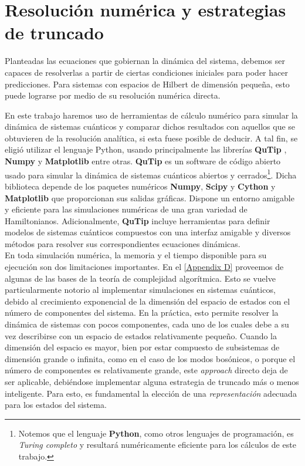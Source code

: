 \documentclass{report} %
\numberwithin{equation}{section}
\begin{document}
\section{Resoluci\'on num\'erica y estrategias de truncado}

Planteadas las ecuaciones que gobiernan la dinámica del sistema, debemos ser capaces de resolverlas a partir de ciertas condiciones iniciales para poder hacer predicciones. Para sistemas con espacios de Hilbert de dimensión pequeña, esto puede lograrse por medio de su resolución numérica  directa. 

En este trabajo haremos uso de herramientas de cálculo numérico para simular la dinámica de sistemas cuánticos y comparar dichos resultados con aquellos que se obtuvieren de la resolución analítica, si esta fuese posible de deducir. 
A tal fin, se eligió utilizar el lenguaje Python, usando principalmente las librerías \textbf{QuTip}
\cite{Qutip2-2013}, \textbf{Numpy} y \textbf{Matplotlib} entre otras.
\textbf{QuTip} es un software de código abierto usado para simular la dinámica de sistemas cuánticos abiertos y cerrados\footnote{Notemos que el lenguaje \textbf{Python}, como otros lenguajes de programación, es \textit{Turing completo }\cite{BE07} y resultará numéricamente eficiente para los cálculos de este trabajo.}. 
Dicha biblioteca depende de los paquetes numéricos \textbf{Numpy}, \textbf{Scipy} y \textbf{Cython} y \textbf{Matplotlib} que proporcionan sus salidas gráficas. 
Dispone un entorno amigable y eficiente para las simulaciones numéricas de una gran variedad de Hamiltonianos. Adicionalmente, \textbf{QuTip} incluye herramientas para definir modelos de sistemas cuánticos compuestos con una interfaz amigable y diversos métodos para resolver sus correspondientes ecuaciones dinámicas. \\

En toda simulación numérica, la memoria y el tiempo disponible para su ejecución son dos limitaciones importantes. En el \autoref{Appendix D} proveemos de algunas de las bases de la teoría de complejidad algorítmica. Esto se vuelve particularmente notorio al implementar simulaciones en sistemas cuánticos, debido al crecimiento exponencial de la dimensión del espacio de estados con el número de componentes del sistema. En la práctica, esto permite resolver la dinámica de sistemas con pocos componentes, cada uno de los cuales debe a su vez describirse con un espacio de estados relativamente pequeño.
Cuando la dimensión del espacio es mayor, bien por estar compuesto de subsistemas de dimensión grande o infinita, como en el caso de los modos bosónicos, o porque el número de componentes es relativamente grande, este \textit{approach} directo deja de ser aplicable, debiéndose implementar alguna estrategia de truncado más o menos inteligente. Para esto, es fundamental la elección de una \emph{representación} adecuada para los estados del sistema. 
\end{document}
